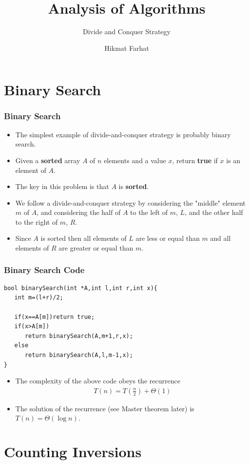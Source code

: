 \documentclass{beamer}
\title{ Analysis of Algorithms}
\subtitle{Divide and Conquer Strategy}
\author{Hikmat Farhat}
\begin{document}
\frame{\titlepage}

\section{Binary Search}
\begin{frame}
  \frametitle{Binary Search}
  \begin{itemize}
  \item The simplest example of divide-and-conquer strategy is probably binary search.
\item Given a \textbf{sorted} array $A$ of $n$ elements and a value $x$, return \textbf{true} if $x$ is an element of $A$.
\item The key in this problem is that $A$ is \textbf{sorted}.
\item We follow a divide-and-conquer strategy by considering the "middle" element $m$ of $A$, and considering the half of $A$ to the left of $m$, $L$,
and the other half to the right of $m$, $R$.
\item Since $A$ is sorted then all elements of $L$ are less or equal than $m$ and all elements of $R$ are greater or equal than $m$.
  \end{itemize}
\end{frame}

\begin{frame}[fragile]
  \frametitle{Binary Search Code}
\begin{lstlisting}
bool binarySearch(int *A,int l,int r,int x){
   int m=(l+r)/2;

   if(x==A[m])return true;
   if(x>A[m]) 
      return binarySearch(A,m+1,r,x);
   else 
      return binarySearch(A,l,m-1,x);
}
\end{lstlisting}
  \begin{itemize}
  \item The complexity of the above code obeys the recurrence 
    \begin{align*}
      T(n)=T(\frac{n}{2})+\Theta(1)
    \end{align*}
\item The solution of the recurrence (see Master theorem later) is $T(n)=\Theta(\log n)$.
  \end{itemize}
\end{frame}


\section{Counting Inversions}
\end{document}
